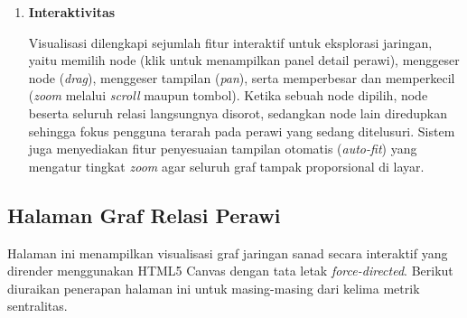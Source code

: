 \begin{enumerate}
\item \textbf{Interaktivitas}

Visualisasi dilengkapi sejumlah fitur interaktif untuk eksplorasi jaringan, yaitu memilih node (klik untuk menampilkan panel detail perawi), menggeser node (\textit{drag}), menggeser tampilan (\textit{pan}), serta memperbesar dan memperkecil (\textit{zoom} melalui \textit{scroll} maupun tombol). Ketika sebuah node dipilih, node beserta seluruh relasi langsungnya disorot, sedangkan node lain diredupkan sehingga fokus pengguna terarah pada perawi yang sedang ditelusuri. Sistem juga menyediakan fitur penyesuaian tampilan otomatis (\textit{auto-fit}) yang mengatur tingkat \textit{zoom} agar seluruh graf tampak proporsional di layar.
\end{enumerate}

\subsection{Halaman Graf Relasi Perawi}
\label{subsec:halaman-graf-relasi}

	Halaman ini menampilkan visualisasi graf jaringan sanad secara interaktif yang dirender menggunakan HTML5 Canvas dengan tata letak \textit{force-directed}. Berikut diuraikan penerapan halaman ini untuk masing-masing dari kelima metrik sentralitas.

